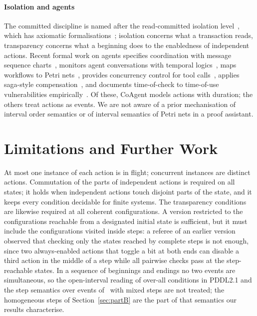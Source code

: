 \documentclass[preprint,12pt]{elsarticle}
\theoremstyle{plain}
\theoremstyle{definition}
\begin{document}
\paragraph{Isolation and agents}
The committed discipline is named after the read-committed isolation level~\cite{Berenson1995}, which has axiomatic formalisations~\cite{CeroneBernardiGotsman2015}; isolation concerns what a transaction reads, transparency concerns what a beginning does to the enabledness of independent actions. Recent formal work on agents specifies coordination with message sequence charts~\cite{BolligFuggerNowak2027}, monitors agent conversations with temporal logics~\cite{CohenHavelundOmerPeled2027SAIV,CohenHavelundOmerPeled2027RV}, maps workflows to Petri nets~\cite{CzejdoDaszczukGrabski2026}, provides concurrency control for tool calls~\cite{LyuEtAl2026CoAgent}, applies saga-style compensation~\cite{ChangGeng2025SagaLLM}, and documents time-of-check to time-of-use vulnerabilities empirically~\cite{LilienthalHong2025}. Of these, CoAgent models actions with duration; the others treat actions as events. We are not aware of a prior mechanisation of interval order semantics or of interval semantics of Petri nets in a proof assistant.

\section{Limitations and Further Work}
\label{sec:future}

At most one instance of each action is in flight; concurrent instances are distinct actions. Commutation of the parts of independent actions is required on all states; it holds when independent actions touch disjoint parts of the state, and it keeps every condition decidable for finite systems. The transparency conditions are likewise required at all coherent configurations. A version restricted to the configurations reachable from a designated initial state is sufficient, but it must include the configurations visited inside steps: a referee of an earlier version observed that checking only the states reached by complete steps is not enough, since two always-enabled actions that toggle a bit at both ends can disable a third action in the middle of a step while all pairwise checks pass at the step-reachable states. In a sequence of beginnings and endings no two events are simultaneous, so the open-interval reading of over-all conditions in PDDL2.1 and the step semantics over events of~\cite{Janicki2019} with mixed steps are not treated; the homogeneous steps of Section~\ref{sec:partB} are the part of that semantics our results characterise.
\end{document}
